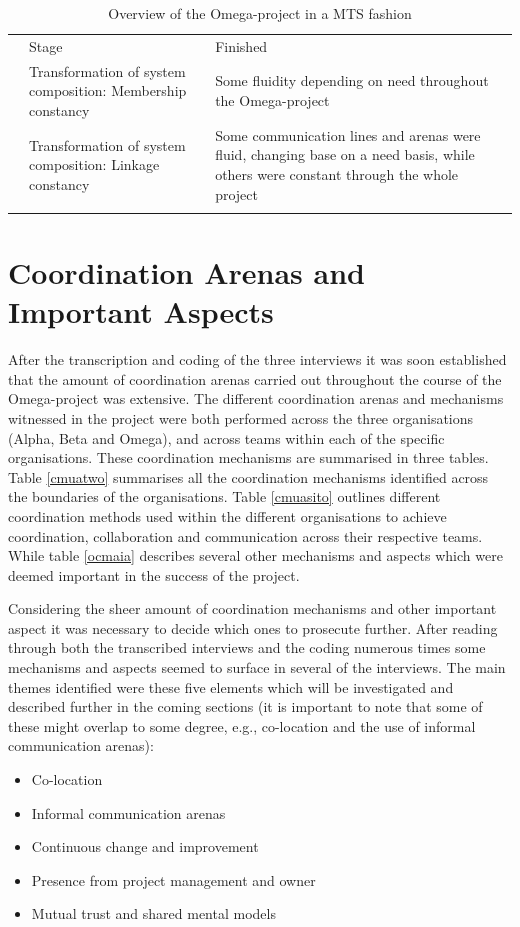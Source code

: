 \begin{center}
\begin{longtable}{ | p{2.5cm} | p{4cm} | p{8cm} | }
	& Stage & Finished \\ \cline{2-3}
	& Transformation of system composition: Membership constancy & Some fluidity depending on need throughout the Omega-project \\ \cline{2-3}
	& Transformation of system composition: Linkage constancy & Some communication lines and arenas were fluid, changing base on a need basis, while others were constant through the whole project \\ \cline{2-3}
	\hline
\caption{Overview of the Omega-project in a MTS fashion}
\label{ootopiamf}
\end{longtable}
\end{center}

\section{Coordination Arenas and Important Aspects}

After the transcription and coding of the three interviews it was soon established that the amount of coordination arenas carried out throughout the course of the Omega-project was extensive. The different coordination arenas and mechanisms witnessed in the project were both performed across the three organisations (Alpha, Beta and Omega), and across teams within each of the specific organisations. These coordination mechanisms are summarised in three tables. Table \ref{cmuatwo} summarises all the coordination mechanisms identified across the boundaries of the organisations. Table \ref{cmuasito} outlines different coordination methods used within the different organisations to achieve coordination, collaboration and communication across their respective teams. While table \ref{ocmaia} describes several other mechanisms and aspects which were deemed important in the success of the project.

Considering the sheer amount of coordination mechanisms and other important aspect it was necessary to decide which ones to prosecute further. After reading through both the transcribed interviews and the coding numerous times some mechanisms and aspects seemed to surface in several of the interviews. The main themes identified were these five elements which will be investigated and described further in the coming sections (it is important to note that some of these might overlap to some degree, e.g., co-location and the use of informal communication arenas):

\begin{itemize}
   \item Co-location
   \item Informal communication arenas
   \item Continuous change and improvement
   \item Presence from project management and owner
   \item Mutual trust and shared mental models
\end{itemize}

